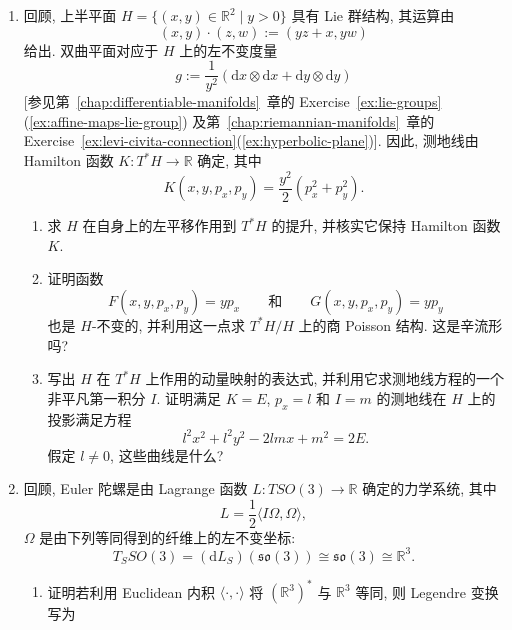 \begin{RiemannExercise}
\begin{enumerate}[label=(\arabic*),ref=\arabic*,leftmargin=*]
\begin{enumerate}[label=(\alph*),leftmargin=*]
\item 求 Poisson 流形 $Q:=T^*M/SO(2)\cong\mathbb{R}^3$ 的 Poisson 双向量. 此流形的辛叶是什么? 举一个非恒定 Casimir 函数的例子.
\item 考虑由下式给出的 Hamilton 函数 $H:T^*Q\to\mathbb{R}$:
\[
  H(r,\theta,p_r,p_\theta)=\frac{p_r^2}{2}+\frac{p_\theta^2}{2r^2}+u(r).
\]
证明 $H$ 是 $SO(2)$-不变的, 并求它在约化 Poisson 流形 $Q$ 上的 Hamilton 流.
\item 利用 Noether 定理, 得到 $H$ 在 $T^*M$ 上的 Hamilton 流所保持的一个量.
\end{enumerate}
\item\label{ex:poisson-reduction-of-hyperbolic-geodesic-flow}
回顾, 上半平面 $H=\{(x,y)\in\mathbb{R}^2\mid y>0\}$ 具有 Lie 群结构, 其运算由
\[
  (x,y)\cdot(z,w):=(yz+x,yw)
\]
给出. 双曲平面对应于 $H$ 上的左不变度量
\[
  g:=\frac{1}{y^2}(\mathrm{d}x\otimes\mathrm{d}x+\mathrm{d}y\otimes\mathrm{d}y)
\]
[参见第~\ref{chap:differentiable-manifolds}~章的 Exercise~\ref{ex:lie-groups}(\ref{ex:affine-maps-lie-group}) 及第~\ref{chap:riemannian-manifolds}~章的 Exercise~\ref{ex:levi-civita-connection}(\ref{ex:hyperbolic-plane})]. 因此, 测地线由 Hamilton 函数 $K:T^*H\to\mathbb{R}$ 确定, 其中
\[
  K(x,y,p_x,p_y)=\frac{y^2}{2}(p_x^2+p_y^2).
\]
\begin{enumerate}[label=(\alph*),leftmargin=*]
\item 求 $H$ 在自身上的左平移作用到 $T^*H$ 的提升, 并核实它保持 Hamilton 函数 $K$.
\item 证明函数
\[
  F(x,y,p_x,p_y)=yp_x\qquad\text{和}\qquad G(x,y,p_x,p_y)=yp_y
\]
也是 $H$-不变的, 并利用这一点求 $T^*H/H$ 上的商 Poisson 结构. 这是辛流形吗?
\item 写出 $H$ 在 $T^*H$ 上作用的动量映射的表达式, 并利用它求测地线方程的一个非平凡第一积分 $I$. 证明满足 $K=E$, $p_x=l$ 和 $I=m$ 的测地线在 $H$ 上的投影满足方程
\[
  l^2x^2+l^2y^2-2lmx+m^2=2E.
\]
假定 $l\ne0$, 这些曲线是什么?
\end{enumerate}
\item\label{ex:lie-poisson-reduction-of-euler-top}
回顾, Euler 陀螺是由 Lagrange 函数 $L:TSO(3)\to\mathbb{R}$ 确定的力学系统, 其中
\[
  L=\frac{1}{2}\langle I\Omega,\Omega\rangle,
\]
$\Omega$ 是由下列等同得到的纤维上的左不变坐标:
\[
  T_SSO(3)=(\mathrm{d}L_S)(\mathfrak{so}(3))\cong\mathfrak{so}(3)\cong\mathbb{R}^3.
\]
\begin{enumerate}[label=(\alph*),leftmargin=*]
\item 证明若利用 Euclidean 内积 $\langle\cdot,\cdot\rangle$ 将 $(\mathbb{R}^3)^*$ 与 $\mathbb{R}^3$ 等同, 则 Legendre 变换写为

\end{enumerate}
\end{enumerate}
\end{RiemannExercise}
